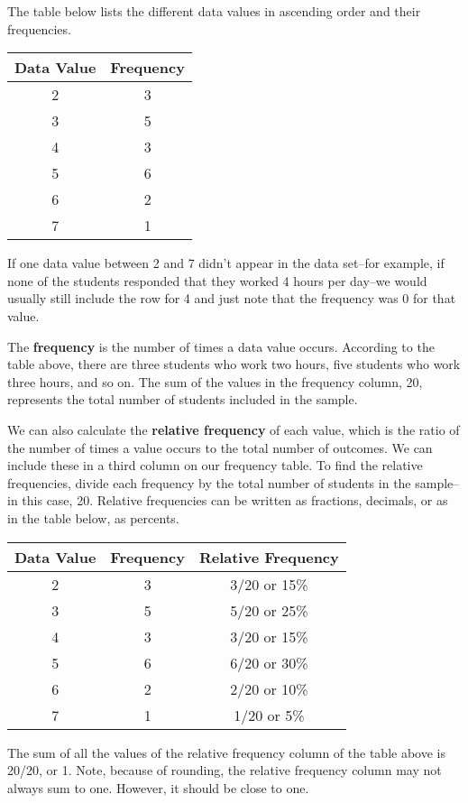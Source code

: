 The table below lists the different data values in ascending order and their frequencies.

\begin{center}
\begin{tabular}{c | c}
\textbf{Data Value} & \textbf{Frequency}\\
\hline
2 & 3\\
3 & 5\\
4 & 3\\
5 & 6\\
6 & 2\\
7 & 1
\end{tabular}
\end{center}

If one data value between 2 and 7 didn't appear in the data set--for example, if none of the students responded that they worked 4 hours per day--we would usually still include the row for 4 and just note that the frequency was 0 for that value.

The \textbf{frequency} is the number of times a data value occurs. According to the table above, there are three students who work two hours, five 
students who work three hours, and so on. The sum of the values in the frequency column, 20, represents the total number of students included in
the sample. 

We can also calculate the \textbf{relative frequency} of each value, which is the ratio of the number of times a value occurs to the total number of outcomes. We can include these in a third column on our frequency table.  To find the relative frequencies, divide each frequency by the total number of students in the sample--in this case, 20. Relative frequencies can be written as fractions, decimals, or as in the table below, as percents.
\begin{center}
\begin{tabular}{c | c | c}
\textbf{Data Value} & \textbf{Frequency} & \textbf{Relative Frequency}\\
\hline
2 & 3 & 3/20 or 15\% \\
3 & 5 & 5/20 or 25\% \\
4 & 3 & 3/20 or 15\% \\
5 & 6 & 6/20 or 30\% \\
6 & 2 & 2/20 or 10\% \\
7 & 1 & 1/20 or 5\%
\end{tabular}
\end{center}
The sum of all the values of the relative frequency column of the table above is 20/20, or 1.  Note, because of rounding, the relative frequency column may not 
always sum to one. However, it should be close to one.


